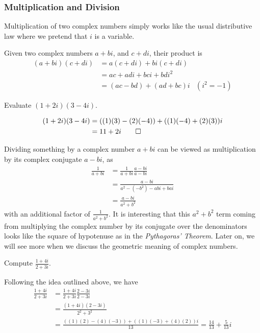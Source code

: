 \subsubsection{Multiplication and Division}
Multiplication of two complex numbers simply works like the usual distributive law where we pretend that $i$ is a variable.
\begin{defn}
Given two complex numbers $a + bi$, and $c + di$, their product is
\begin{align}
(a + bi)(c + di) &= a(c + di) + bi(c + di) \nonumber\\
&= ac + adi + bci + bdi^2 \nonumber \\
&= (ac - bd) + (ad + bc)i & (i^2 = -1)
\end{align}
\end{defn}

\begin{exmp}
Evaluate $(1+2i)(3-4i)$.
\end{exmp}
\begin{solution}
\begin{align*}
(1+2i)(3-4i) &= ((1)(3) - (2)(-4)) + ((1)(-4) + (2)(3))i \\
&= 11 + 2i \qedhere
\end{align*}
\end{solution}

Dividing something by a complex number $a+bi$ can be viewed as multiplication by its complex conjugate $a-bi$, as
\begin{align}
\frac{1}{a+bi} &= \frac{1}{a+bi}\frac{a-bi}{a-bi} \nonumber \\
&= \frac{a-bi}{a^2 - (-b^2) - abi + bai} \nonumber \\
&= \frac{a-bi}{a^2 + b^2}
\end{align}
with an additional factor of $\frac{1}{a^2+b^2}$. It is interesting that this $a^2+b^2$ term coming from multiplying the complex number by its conjugate over the denominators looks like the square of hypotenuse as in the \textit{Pythagoras' Theorem}. Later on, we will see more when we discuss the geometric meaning of complex numbers.

\begin{exmp}
Compute $\frac{1+4i}{2+3i}$.
\end{exmp}
\begin{solution}
Following the idea outlined above, we have
\begin{align*}
\frac{1+4i}{2+3i} &= \frac{1+4i}{2+3i}\frac{2-3i}{2-3i} \\
&= \frac{(1+4i)(2-3i)}{2^2+3^2} \\
&= \frac{((1)(2) - (4)(-3)) + ((1)(-3) + (4)(2))i}{13} = \frac{14}{13}+\frac{5}{13}i
\end{align*}
\end{solution}

